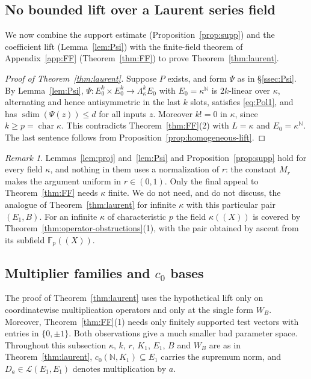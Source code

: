 \documentclass[11pt]{amsart}
\theoremstyle{definition}
\theoremstyle{remark}
\newtheorem{remark}[theorem]{Remark}
\numberwithin{equation}{section}
\newcommand{\N}{\mathbb N}
\newcommand{\F}{\mathbb F}
\newcommand{\cL}{\mathcal L}
\newcommand{\sdim}{\operatorname{sdim}}
\begin{document}
\subsection{No bounded lift over a Laurent series field}

We now combine the support estimate (Proposition~\ref{prop:supp}) and the coefficient lift (Lemma~\ref{lem:Psi}) with the finite-field theorem of Appendix~\ref{app:FF} (Theorem~\ref{thm:FF}) to prove Theorem~\ref{thm:laurent}.

\begin{proof}[Proof of Theorem~\ref{thm:laurent}]
Suppose $P$ exists, and form $\Psi$ as in \S\ref{ssec:Psi}. By Lemma~\ref{lem:Psi},
$\Psi\colon E_0^k\times E_0^k\to\Lambda^k_\kappa E_0$ with $E_0=\kappa^\N$ is $2k$\nobreakdash-linear over $\kappa$, alternating and hence
antisymmetric in the last $k$ slots, satisfies \eqref{eq:Pol1}, and has $\sdim(\Psi(z))\le d$ for all inputs $z$. Moreover
$k!=0$ in $\kappa$, since $k\ge p=\operatorname{char}\kappa$. This contradicts Theorem~\ref{thm:FF}(2) with $L=\kappa$
and $E_0=\kappa^\N$. The last sentence follows from Proposition~\ref{prop:homogeneous-lift}.
\end{proof}

\begin{remark}\label{rem:infkappa}
Lemmas~\ref{lem:proj} and~\ref{lem:Psi} and Proposition~\ref{prop:supp} hold for every field $\kappa$, and nothing in them
uses a normalization of $r$: the constant $M_r$ makes the argument uniform in $r\in(0,1)$. Only the final appeal to
Theorem~\ref{thm:FF} needs $\kappa$ finite. We do not need, and do not discuss, the analogue of
Theorem~\ref{thm:laurent} for infinite $\kappa$ with this particular pair $(E_1,B)$. For an infinite $\kappa$ of
characteristic $p$ the field $\kappa((X))$ is covered by Theorem~\ref{thm:operator-obstructions}(1), with the pair obtained by ascent from its
subfield $\F_p((X))$.
\end{remark}

\subsection{Multiplier families and \texorpdfstring{$c_0$}{c0} bases}\label{lau:ssec:multipliers}
The proof of Theorem~\ref{thm:laurent} uses the hypothetical lift only on coordinatewise multiplication operators and
only at the single form $W_B$. Moreover, Theorem~\ref{thm:FF}(1) needs only finitely supported test vectors with
entries in $\{0,\pm1\}$. Both observations give a much smaller bad parameter space. Throughout this subsection
$\kappa$, $k$, $r$, $K_1$, $E_1$, $B$ and $W_B$ are as in Theorem~\ref{thm:laurent}, $c_0(\N,K_1)\subseteq E_1$ carries the
supremum norm, and $D_a\in\cL(E_1,E_1)$ denotes multiplication by $a$.
\end{document}
